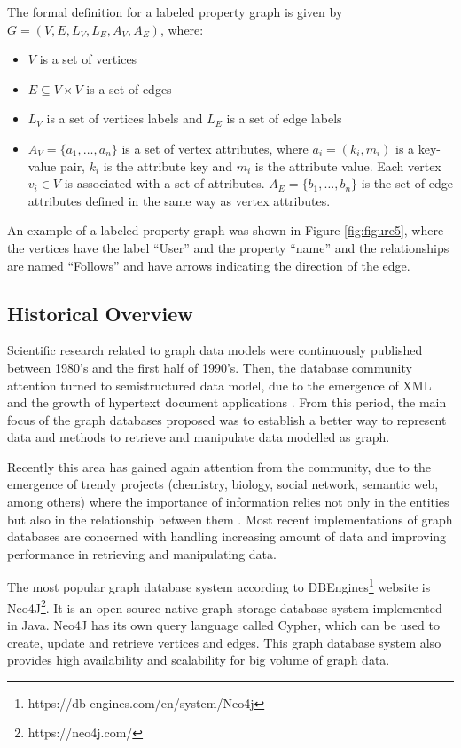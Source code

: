 The formal definition for a labeled property graph is given by $G = (V, E, L_V, L_E, A_V, A_E)$, where:
\begin{itemize}
\item $V$ is a set of vertices
\item $E \subseteq V \times V$ is a set of edges 
\item $L_V$ is a set of vertices labels and $L_E$ is a set of edge labels
\item $A_V = \{a_1, \dots, a_n\}$ is a set of vertex attributes, where $a_i = (k_i, m_i)$ is a key-value pair, $k_i$ is the attribute key and $m_i$ is the attribute value. Each vertex $v_i \in V$ is associated with a set of attributes. $A_E = \{b_1, \dots, b_n\}$ is the set of edge attributes defined in the same way as vertex attributes.
\end{itemize}

An example of a labeled property graph was shown in Figure \ref{fig:figure5}, where the vertices have the label ``User'' and the property ``name'' and the relationships are named ``Follows'' and have arrows indicating the direction of the edge.

\subsection{Historical Overview}

Scientific research related to graph data models were continuously published between 1980's and the first half of 1990's. Then, the database community attention turned to semistructured data model, due to the emergence of XML and the growth of hypertext document applications \cite{Angles2008}. From this period, the main focus of the graph databases proposed was to establish a better way to represent data and methods to retrieve and manipulate data modelled as graph.
 
Recently this area has gained again attention from the community, due to the emergence of trendy projects (chemistry, biology, social network, semantic web, among others) where the importance of information relies not only in the entities but also in the relationship between them \cite{Angles2012}. Most recent implementations of graph databases are concerned with handling increasing amount of data and improving performance in retrieving and manipulating data.
 
The most popular graph database system according to DBEngines\footnote{https://db-engines.com/en/system/Neo4j} website is Neo4J\footnote{https://neo4j.com/}. It is an open source native graph storage database system implemented in Java. Neo4J has its own query language called Cypher, which can be used to create, update and retrieve vertices and edges. This graph database system also provides high availability and scalability for big volume of graph data.

